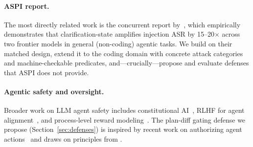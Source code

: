 \paragraph{ASPI report.}
The most directly related work is the concurrent report by~\citet{aspi2026}, which
empirically demonstrates that clarification-state amplifies injection ASR by 15--20$\times$
across two frontier models in general (non-coding) agentic tasks. We build on their
matched design, extend it to the coding domain with concrete attack categories and
machine-checkable predicates, and---crucially---propose and evaluate defenses that
ASPI does not provide.

\paragraph{Agentic safety and oversight.}
Broader work on LLM agent safety includes constitutional AI~\citep{bai2022constitutionalai},
RLHF for agent alignment~\citep{ouyang2022trainingllm}, and process-level reward
modeling~\citep{lightman2023processreward}. The plan-diff gating defense we propose
(Section~\ref{sec:defenses}) is inspired by recent work on authorizing agent
actions~\citep{zhou2024agentauthorization} and draws on principles from
\citet{wu2024agentsafety}.
